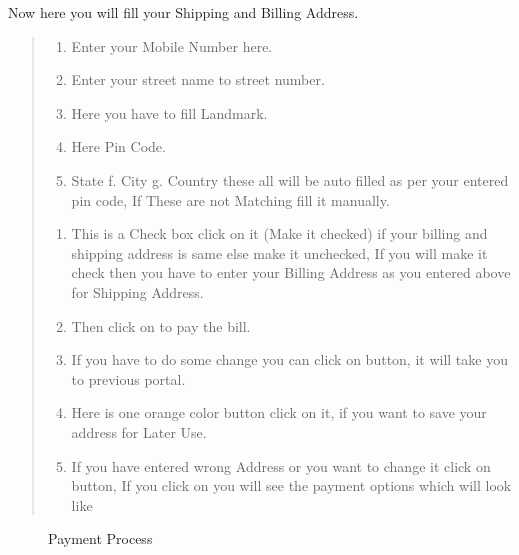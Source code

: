 \documentclass[a4paper,10pt,english]{report}
\begin{document}
Now here you will fill your Shipping and Billing Address.
\begin{quote}
\begin{enumerate}
\def\theenumi{\alph{enumi}}
\def\labelenumi{\theenumi .}
\makeatletter\def\p@enumii{\p@enumi \theenumi .}\makeatother
\item {} 
Enter your Mobile Number here.

\item {} 
Enter your street name to street number.

\item {} 
Here you have to fill Landmark.

\item {} 
Here Pin Code.

\item {} 
State  f. City  g. Country these all will be auto filled as per your entered pin code, If These are not Matching fill it manually.

\end{enumerate}
\begin{enumerate}
\def\theenumi{\alph{enumi}}
\def\labelenumi{\theenumi .}
\makeatletter\def\p@enumii{\p@enumi \theenumi .}\makeatother
\setcounter{enumi}{7}
\item {} 
This is a Check box click on it (Make it checked) if your billing and shipping address is same else make it unchecked, If you will make it check then you have to enter your Billing Address as you entered above for Shipping Address.

\item {} 
Then click on  to pay the bill.

\item {} 
If you have to do some change you can click on  button, it will take you to previous portal.

\item {} 
Here is one orange color button click on it, if you want to save your address for Later Use.

\item {} 
If you have entered wrong Address or you want to change it click on  button, If you click on  you will see the payment options which will look like

\end{enumerate}
\end{quote}

\begin{figure}[htbp]
\centering
\capstart

\noindent{}
\caption{Payment Process}\label{\detokenize{index:id17}}\label{\detokenize{index:id7}}\end{figure}
\end{document}

